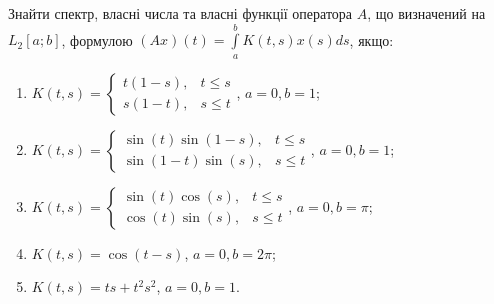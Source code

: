 \begin{exercise}\label{N:1_8_9}
    Знайти спектр, власні числа та власні функції оператора $A$,
    що визначений на $L_2[a;b]$, формулою $(Ax)(t) = \int\limits_a^b K(t,s) x(s)ds$, якщо:
    \begin{enumerate}
        \item $K(t,s) = \begin{cases}
            t(1-s), & t \leq s \\
            s(1-t), & s \leq t
        \end{cases}$, $a = 0, b = 1$;
        \item $K(t,s) = \begin{cases}
            \sin(t)\sin(1-s), & t \leq s \\
            \sin(1-t)\sin(s), & s \leq t
        \end{cases}$, $a = 0, b = 1$;
        \item $K(t,s) = \begin{cases}
            \sin(t)\cos(s), & t \leq s \\
            \cos(t)\sin(s), & s \leq t
        \end{cases}$, $a = 0, b = \pi$;
        \item $K(t,s) = \cos(t-s)$, $a = 0, b = 2\pi$;
        \item $K(t,s) = ts + t^2 s^2$, $a = 0, b = 1$.
    \end{enumerate}
\end{exercise}